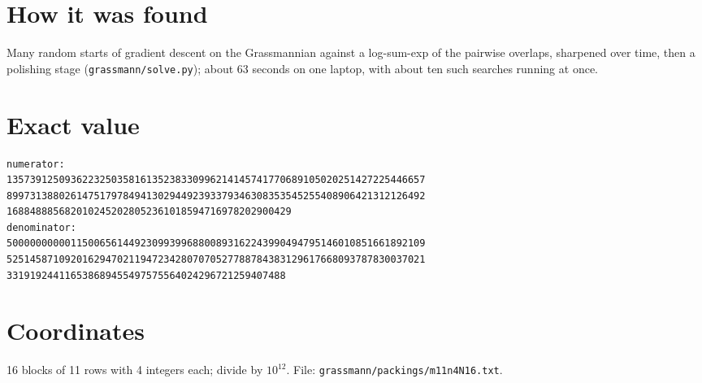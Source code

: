 \documentclass[11pt,a4paper]{article}
\begin{document}
\section{How it was found}
Many random starts of gradient descent on the Grassmannian against a log-sum-exp of the pairwise overlaps, sharpened over time, then a polishing stage (\texttt{grassmann/solve.py}); about 63 seconds on one laptop, with about ten such searches running at once.


\appendix
\section{Exact value}
{\small
\begin{verbatim}
numerator:
135739125093622325035816135238330996214145741770689105020251427225446657
899731388026147517978494130294492393379346308353545255408906421312126492
1688488856820102452028052361018594716978202900429
denominator:
500000000001150065614492309939968800893162243990494795146010851661892109
525145871092016294702119472342807070527788784383129617668093787830037021
331919244116538689455497575564024296721259407488
\end{verbatim}}

\section{Coordinates}
16 blocks of 11 rows with 4 integers each; divide by $10^{12}$. File: \texttt{grassmann/packings/m11n4N16.txt}.
{\tiny
\begin{multicols}{3}
\end{multicols}}
\end{document}
